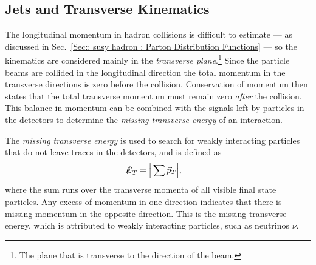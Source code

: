 \documentclass[twoside,english]{uiofysmaster}
\begin{document}
{\subsection{Jets and Transverse Kinematics}\label{Sec:: susy hadron : Jets and transverse kinematics}

The longitudinal momentum in hadron collisions is difficult to estimate --- as discussed in Sec.~\ref{Sec:: susy hadron : Parton Distribution Functions} --- so the kinematics are considered mainly in the \textit{transverse plane}.\footnote{The plane that is transverse to the direction of the beam.} Since the particle beams are collided in the longitudinal direction the total momentum in the transverse directions is zero before the collision. Conservation of momentum then states that the total transverse momentum must remain zero \textit{after} the collision. This balance in momentum can be combined with the signals left by particles in the detectors to determine the \textit{missing transverse energy} of an interaction.

The \textit{missing transverse energy} is used to search for weakly interacting particles that do not leave traces in the detectors, and is defined as
\begin{align}\label{Eq:: susy hadron : Missing energy}
\slashed{E}_T &= \Big| \sum \vec{p}_T \Big| ,
\end{align} 
where the sum runs over the transverse momenta of all visible final state particles.  Any excess of momentum in one direction indicates that there is missing momentum in the opposite direction. This is the missing transverse energy, which is attributed to weakly interacting particles, such as neutrinos $\nu$.  


}
\end{document}
